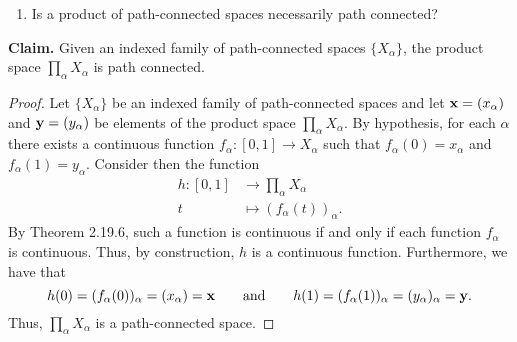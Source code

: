 \begin{solution}
  \begin{enumerate}[label={(\alph*)}, align=left, leftmargin=\parindent, listparindent=\parindent, labelwidth=0pt, itemindent=!]
    \item
      Is a product of path-connected spaces necessarily path connected?
  \end{enumerate}
  \textbf{Claim.} Given an indexed family of path-connected spaces $\{X_\alpha\}$, the product space $\prod_\alpha X_\alpha$ is path connected.
  \begin{proof}
    Let $\{X_\alpha\}$ be an indexed family of path-connected spaces and let $\mathbf{x} = (x_\alpha)$ and $\mathbf{y} = (y_\alpha)$ be elements of the product space $\prod_\alpha X_\alpha$.
    By hypothesis, for each $\alpha$ there exists a continuous function $f_\alpha: [0, 1] \rightarrow X_\alpha$ such that $f_\alpha(0) = x_\alpha$ and $f_\alpha(1) =y_\alpha$.
    Consider then the function
    \begin{equation*}
      \begin{aligned}
        h: [0, 1] &\rightarrow \prod_\alpha X_\alpha \\
        t         &\mapsto (f_\alpha(t))_\alpha.
      \end{aligned}
    \end{equation*}
    By Theorem 2.19.6, such a function is continuous if and only if each function $f_\alpha$ is continuous.
    Thus, by construction, $h$ is a continuous function.
    Furthermore, we have that
    \begin{equation*}
      h(0) = (f_\alpha(0))_\alpha = (x_\alpha) = \mathbf{x} \qquad\text{and}\qquad h(1) = (f_\alpha(1))_\alpha = (y_\alpha)_\alpha = \mathbf{y}.
    \end{equation*}
    Thus, $\prod_\alpha X_\alpha$ is a path-connected space.
  \end{proof}


\end{solution}
